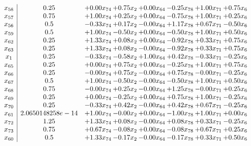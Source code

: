 \documentclass[8pt]{article}
\begin{document}
\[\begin{array}{c| c c@{\hskip 2pt} c@{\hskip 2pt} c@{\hskip 2pt} c@{\hskip 2pt} c@{\hskip 2pt} c@{\hskip 2pt} }
 x_{58}   &  0.25 & +  0.00 x_{74} & +  0.75 x_{2} & +  0.00 x_{64} & -0.25 x_{78} & +  1.00 x_{71} & +  0.75 x_{6}\\
 x_{57}   &  0.75 & +  1.00 x_{74} & +  0.25 x_{2} & +  0.00 x_{64} & -0.75 x_{78} & +  1.00 x_{71} & +  0.25 x_{6}\\
 x_{56}   &  0.5 & -0.33 x_{74} & +  0.17 x_{2} & -0.00 x_{64} & +  1.17 x_{78} & +  0.67 x_{71} & -0.50 x_{6}\\
 x_{59}   &  0.5 & +  1.00 x_{74} & -0.50 x_{2} & +  0.00 x_{64} & -0.50 x_{78} & +  1.00 x_{71} & +  0.50 x_{6}\\
 x_{62}   &  0.25 & +  1.33 x_{74} & +  0.08 x_{2} & +  0.00 x_{64} & -0.92 x_{78} & +  0.33 x_{71} & +  0.75 x_{6}\\
 x_{63}   &  0.25 & +  1.33 x_{74} & +  0.08 x_{2} & -0.00 x_{64} & -0.92 x_{78} & +  0.33 x_{71} & +  0.75 x_{6}\\
 x_{1}   &  0.25 & -0.33 x_{74} & -0.58 x_{2} & +  1.00 x_{64} & +  0.42 x_{78} & -0.33 x_{71} & -0.25 x_{6}\\
 x_{65}   &  0.25 & +  0.00 x_{74} & +  0.75 x_{2} & +  0.00 x_{64} & -0.25 x_{78} & +  1.00 x_{71} & +  0.75 x_{6}\\
 x_{66}   &  0.25 & -0.00 x_{74} & +  0.75 x_{2} & -0.00 x_{64} & +  0.75 x_{78} & -0.00 x_{71} & -0.25 x_{6}\\
 x_{67}   &  0.5 & +  1.00 x_{74} & -0.50 x_{2} & -0.00 x_{64} & -0.50 x_{78} & +  1.00 x_{71} & +  0.50 x_{6}\\
 x_{68}   &  0.75 & -0.00 x_{74} & +  0.25 x_{2} & -0.00 x_{64} & +  1.25 x_{78} & -0.00 x_{71} & +  0.25 x_{6}\\
 x_{69}   &  0.25 & +  0.00 x_{74} & -0.25 x_{2} & +  0.00 x_{64} & +  0.75 x_{78} & +  1.00 x_{71} & -0.25 x_{6}\\
 x_{70}   &  0.25 & -0.33 x_{74} & +  0.42 x_{2} & -0.00 x_{64} & +  0.42 x_{78} & +  0.67 x_{71} & -0.25 x_{6}\\
 x_{61}   &  2.0650148258e-14 & +  1.00 x_{74} & -0.00 x_{2} & +  0.00 x_{64} & -1.00 x_{78} & +  1.00 x_{71} & +  0.00 x_{6}\\
 x_{72}   &  1.25 & +  1.33 x_{74} & +  0.08 x_{2} & -0.00 x_{64} & +  0.08 x_{78} & +  0.33 x_{71} & -0.25 x_{6}\\
 x_{73}   &  0.75 & +  0.67 x_{74} & -0.08 x_{2} & +  0.00 x_{64} & -0.08 x_{78} & +  0.67 x_{71} & +  0.25 x_{6}\\
 x_{60}   &  0.5 & +  1.33 x_{74} & -0.17 x_{2} & -0.00 x_{64} & -0.17 x_{78} & +  0.33 x_{71} & +  0.50 x_{6}\\

\end{array}\]
\end{document}

